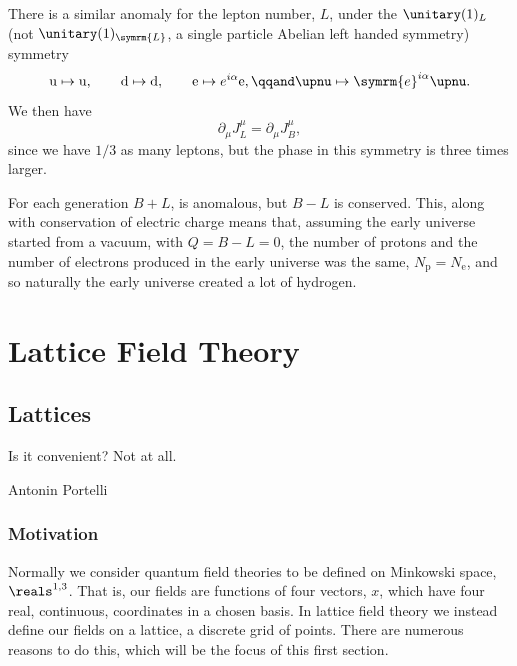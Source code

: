 \documentclass[fleqn]{NotesClass}
\newcommand{\Pparticle}[1]{\mathrm{#1}}
\newcommand{\Pu}{\ensuremath{\Pparticle{u}}}
\newcommand{\Pd}{\ensuremath{\Pparticle{d}}}
\newcommand{\Pex}{\ensuremath{\Pparticle{e}}}
\newcommand{\Pnu}{\ensuremath{\upnu}}
\newcommand{\Pp}{\ensuremath{\Pparticle{p}}}
\newcommand{\e}{\symrm{e}}
\newcommand{\bare}{\symrm{B}}
\newcommand{\Left}{\symrm{L}}
\newcommand{\minkowskiSpace}{\reals^{1,3}}
\begin{document}
    There is a similar anomaly for the lepton number, \(L\), under the \(\unitary(1)_{L}\) (not \(\unitary(1)_{\Left}\), a single particle Abelian left handed symmetry) symmetry 
    \begin{equation}
        \Pu \mapsto \Pu, \qquad \Pd \mapsto \Pd, \qquad \Pex \mapsto e^{i\alpha}\Pex, \qqand \Pnu \mapsto \e^{i\alpha}\Pnu.
    \end{equation}
    We then have
    \begin{equation}
        \partial_\mu J^{\mu}_{L} = \partial_\mu J^\mu_B,
    \end{equation}
    since we have \(1/3\) as many leptons, but the phase in this symmetry is three times larger.
    
    For each generation \(B + L\), is anomalous, but \(B - L\) is conserved.
    This, along with conservation of electric charge means that, assuming the early universe started from a vacuum, with \(Q = B - L = 0\), the number of protons and the number of electrons produced in the early universe was the same, \(N_{\Pp} = N_{\Pex}\), and so naturally the early universe created a lot of hydrogen.
    
    
    
    
    
    
    
    
    
    
    \renewcommand{\bare}{0}
    
    
    
    
    
    
    
    
    
    
    
    
    
    \part{Lattice Field Theory}
    \chapter{Lattices}
    \epigraph{Is it convenient? Not at all.}{Antonin Portelli}
    \section{Motivation}
    Normally we consider quantum field theories to be defined on Minkowski space, \(\minkowskiSpace\).
    That is, our fields are functions of four vectors, \(x\), which have four real, continuous, coordinates in a chosen basis.
    In lattice field theory we instead define our fields on a lattice, a discrete grid of points.
    There are numerous reasons to do this, which will be the focus of this first section.
    
\end{document}
